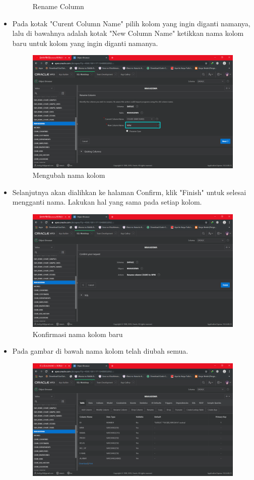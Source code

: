 \documentclass[12pt, times new roman]{article}
\begin{document}
\begin{itemize}
\begin{figure}[htbp]
	\caption{Rename Column}
\end{figure}
\item Pada kotak "Curent Column Name" pilih kolom yang ingin diganti namanya, lalu di bawahnya adalah kotak "New Column Name" ketikkan nama kolom baru untuk kolom yang ingin diganti namanya.
\begin{figure}[htbp]
	\centering
	\includegraphics[width=10.5cm]{figures/15.png}
	\caption{Mengubah nama kolom}
\end{figure}
\item Selanjutnya akan dialihkan ke halaman Confirm, klik "Finish" untuk selesai mengganti nama. Lakukan hal yang sama pada setiap kolom.
\begin{figure}[htbp]
	\centering
	\includegraphics[width=10.5cm]{figures/16.png}
	\caption{Konfirmasi nama kolom baru}
\end{figure}
\item Pada gambar di bawah nama kolom telah diubah semua.
\begin{figure}[htbp]
	\centering
	\includegraphics[width=10.5cm]{figures/18.png}

\end{figure}
\end{itemize}
\end{document}
